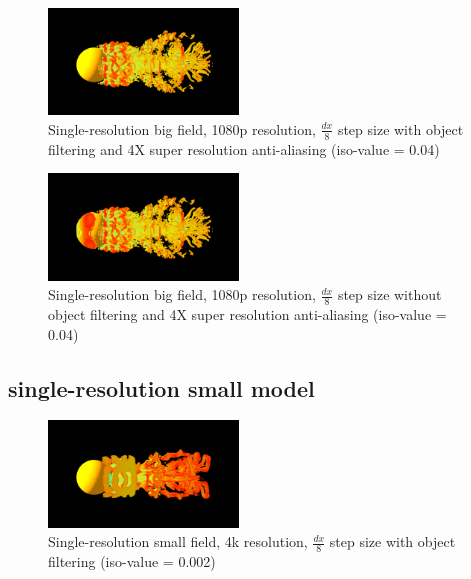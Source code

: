 \documentclass[acmtog]{acmart}
\begin{document}
    \begin{figure}[H]
        \centering
        \includegraphics[width=0.45\textwidth]{./image/single_big_1080p_8_filter_0.04_4XRES}
        \caption{Single-resolution big field, 1080p resolution, $ \frac{dx}{8} $ step size with object filtering and 4X super resolution anti-aliasing (iso-value = 0.04)}\label{fig:figure11}
    \end{figure}

    \begin{figure}[H]
        \centering
        \includegraphics[width=0.45\textwidth]{./image/single_big_1080p_8_no_filter_0.04_4XRES}
        \caption{Single-resolution big field, 1080p resolution, $ \frac{dx}{8} $ step size without object filtering and 4X super resolution anti-aliasing (iso-value = 0.04)}\label{fig:figure12}
    \end{figure}

    \subsection{single-resolution small model}\label{subsec:single-resolution-small-model}
    \begin{figure}[H]
        \centering
        \includegraphics[width=0.45\textwidth]{./image/single_small_4k_8_filter_0.002}
        \caption{Single-resolution small field, 4k resolution, $ \frac{dx}{8} $ step size with object filtering (iso-value = 0.002)}\label{fig:figure13}
    \end{figure}
\end{document}
